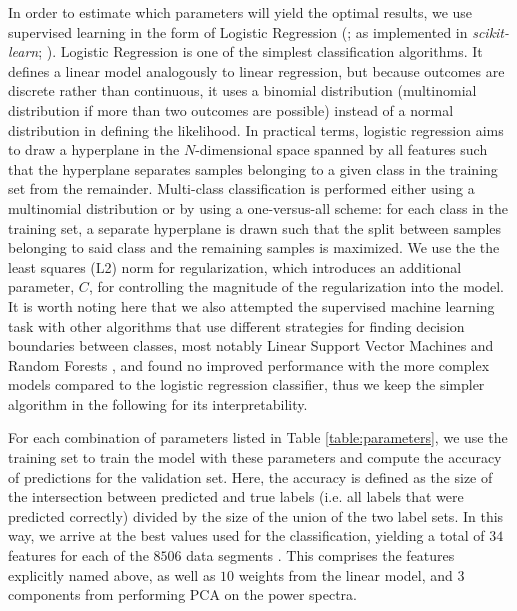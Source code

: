 \documentclass[12pt]{emulateapj}
\begin{document}
In order to estimate which parameters will yield the optimal results, we use supervised learning in the form of Logistic Regression (\citealt{cox1958}; as implemented in \textit{scikit-learn}; \citealt{scikit-learn}). Logistic Regression is one of the simplest classification algorithms. It defines a linear model analogously to linear regression, but because outcomes are discrete rather than continuous, it uses a binomial distribution (multinomial distribution if more than two outcomes are possible) instead of a normal distribution in defining the likelihood. In practical terms, logistic regression aims to draw a hyperplane in the $N$-dimensional space spanned by all features such that the hyperplane separates samples belonging to a given class in the training set from the remainder. Multi-class classification is performed either using a multinomial distribution or by using a one-versus-all scheme: for each class in the training set, a separate hyperplane is drawn such that the split between samples belonging to said class and the remaining samples is maximized. We use the the least squares (L2) norm for regularization, which introduces an additional parameter, $C$, for controlling the magnitude of the regularization into the  model. It is worth noting here that we also attempted the supervised machine learning task with other algorithms that use different strategies for finding decision boundaries between classes, most notably Linear Support Vector Machines \citep{guyon1993,cortes1995} and Random Forests \citep{breiman2001}, and found no improved performance with the more complex models compared to the logistic regression classifier, thus we keep the simpler algorithm in the following for its interpretability.

For each combination of parameters listed in Table \ref{table:parameters}, we use the training set to train the model with these parameters and compute the accuracy of predictions for the validation set. Here, the accuracy is defined as the size of the intersection between predicted and true labels (i.e. all labels that were predicted correctly) divided by the size of the union of the two label sets. In this way, we arrive at the best values used for the classification, yielding a total of $34$ features for each of the $8506$ data segments . This comprises the features explicitly named above, as well as $10$ weights from the linear model, and $3$ components from performing PCA on the power spectra.
\end{document}

